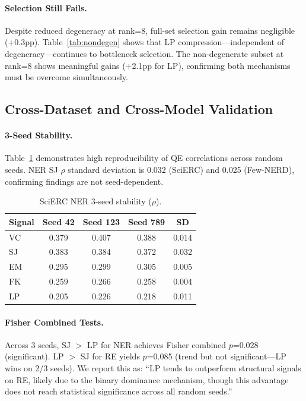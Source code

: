 \documentclass[11pt]{article}
\begin{document}
\paragraph{Selection Still Fails.} Despite reduced degeneracy at rank=8, full-set selection gain remains negligible (+0.3pp). Table~\ref{tab:nondegen} shows that LP compression---independent of degeneracy---continues to bottleneck selection. The non-degenerate subset at rank=8 shows meaningful gains (+2.1pp for LP), confirming both mechanisms must be overcome simultaneously.

\subsection{Cross-Dataset and Cross-Model Validation}

\paragraph{3-Seed Stability.} Table~\ref{tab:3seed} demonstrates high reproducibility of QE correlations across random seeds. NER SJ $\rho$ standard deviation is 0.032 (SciERC) and 0.025 (Few-NERD), confirming findings are not seed-dependent.

\begin{table}[t]
\centering
\small
\caption{SciERC NER 3-seed stability ($\rho$).}
\label{tab:3seed}
\begin{tabular}{lcccc}
\toprule
Signal & Seed 42 & Seed 123 & Seed 789 & SD \\
\midrule
VC & 0.379 & 0.407 & 0.388 & 0.014 \\
SJ & 0.383 & 0.384 & 0.372 & 0.032 \\
EM & 0.295 & 0.299 & 0.305 & 0.005 \\
FK & 0.259 & 0.266 & 0.258 & 0.004 \\
LP & 0.205 & 0.226 & 0.218 & 0.011 \\
\bottomrule
\end{tabular}
\end{table}

\paragraph{Fisher Combined Tests.} Across 3 seeds, SJ $>$ LP for NER achieves Fisher combined $p$=0.028 (significant). LP $>$ SJ for RE yields $p$=0.085 (trend but not significant---LP wins on 2/3 seeds). We report this as: ``LP tends to outperform structural signals on RE, likely due to the binary dominance mechanism, though this advantage does not reach statistical significance across all random seeds.''
\end{document}
